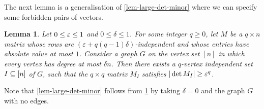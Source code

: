 \documentclass{daj}
\theoremstyle{plain}
\theoremstyle{plain}
\newtheorem{lem}[thm]{Lemma}
\theoremstyle{plain}
\theoremstyle{plain}
\theoremstyle{definition}
\theoremstyle{plain}
\theoremstyle{plain}
\theoremstyle{definition}
\theoremstyle{definition}
\theoremstyle{plain}
\begin{document}
The next lemma is a generalisation of \cref{lem-large-det-minor} where we can specify some forbidden pairs of vectors.

\begin{lem}\label{lem-large-det-minor-graph-version}
Let $0\leq \varepsilon\leq 1$ and $0\leq \delta\leq 1$. For some integer $q\geq 0$, let $M$ be a $q\times n$ matrix whose rows are $(\varepsilon+q(q-1)\delta)$-independent and whose entries have absolute value at most $1$. Consider a graph $G$ on the vertex set $[n]$ in which every vertex has degree at most $\delta n$. Then there exists a $q$-vertex independent set $I\subseteq [n]$ of $G$, such that the $q\times q$ matrix $M_I$ satisfies $|\det M_I|\ge \varepsilon^q$.
\end{lem}

Note that \cref{lem-large-det-minor} follows from \cref{lem-large-det-minor-graph-version} by taking $\delta=0$ and the graph $G$ with no edges.
\end{document}
